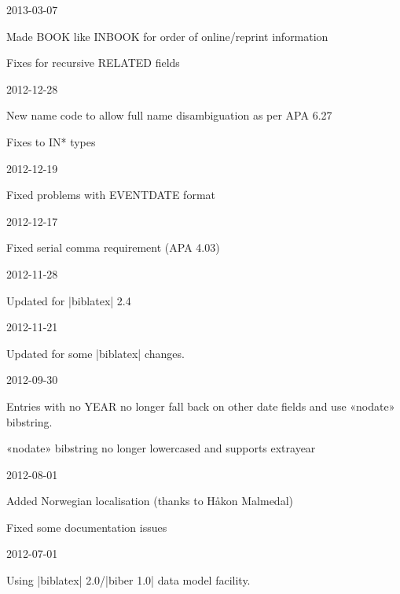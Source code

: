 \documentclass{ltxdockit}
\begin{document}
\begin{changelog}
\begin{release}{5.8}{2013-03-07}
\item Made BOOK like INBOOK for order of online/reprint information
\item Fixes for recursive RELATED fields
\end{release}

\begin{release}{5.7}{2012-12-28}
\item New name code to allow full name disambiguation as per APA 6.27
\item Fixes to IN* types
\end{release}

\begin{release}{5.6}{2012-12-19}
\item Fixed problems with EVENTDATE format
\end{release}

\begin{release}{5.5}{2012-12-17}
\item Fixed serial comma requirement (APA 4.03)
\end{release}

\begin{release}{5.4}{2012-11-28}
\item Updated for |biblatex| 2.4
\end{release}

\begin{release}{5.3}{2012-11-21}
\item Updated for some |biblatex| changes.
\end{release}

\begin{release}{5.2}{2012-09-30}
\item Entries with no YEAR no longer fall back on other date fields
  and use «nodate» bibstring.
\item «nodate» bibstring no longer lowercased and supports extrayear
\end{release}

\begin{release}{5.1}{2012-08-01}
\item Added Norwegian localisation (thanks to Håkon Malmedal)
\item Fixed some documentation issues
\end{release}

\begin{release}{5.0}{2012-07-01}
\item Using |biblatex| 2.0/|biber 1.0| data model facility.
\end{release}


\end{changelog}
\end{document}
